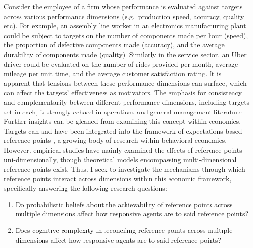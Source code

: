 \documentclass[12pt, letterpaper]{article}
\begin{document}
Consider the employee of a firm whose performance is evaluated against targets across various performance dimensions (e.g.~production speed, accuracy, quality etc). For example, an assembly line worker in an electronics manufacturing plant could be subject to targets on the number of components made per hour (speed), the proportion of defective components made (accuracy), and the average durability of components made (quality). Similarly in the service sector, an Uber driver could be evaluated on the number of rides provided per month, average mileage per unit time, and the average customer satisfaction rating. It is apparent that tensions between these performance dimensions can surface, which can affect the targets' effectiveness as motivators. The emphasis for consistency and complementarity between different performance dimensions, including targets set in each, is strongly echoed in operations and general management literature \parencite[e.g.][]{hayes.1984.restoringour,hayes.1978.howshould,skinner.1974.focusedfactory,skinner.1996.manufacturingstrategy,swamidass.2000.focusedfactory}. Further insights can be gleaned from examining this concept within economics. Targets can and have been integrated into the framework of expectations-based reference points \parencite{heath.1999.goalsreference,vonrechenberg.2016.goalsreference}, a growing body of research within behavioral economics. However, empirical studies have mainly examined the effects of reference points uni-dimensionally, though theoretical models encompassing multi-dimensional reference points exist. Thus, I seek to investigate the mechanisms through which reference points interact across dimensions within this economic framework, specifically answering the following research questions:

\begin{enumerate}
\item Do probabilistic beliefs about the achievability of reference points across multiple dimensions affect how responsive agents are to said reference points?
\item Does cognitive complexity in reconciling reference points across multiple dimensions affect how responsive agents are to said reference points?
\end{enumerate}
\end{document}
